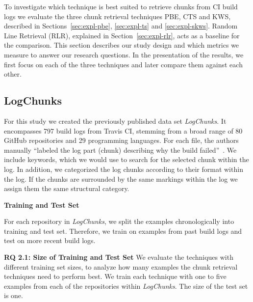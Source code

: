 To investigate which technique is best suited to retrieve chunks from
CI build logs we evaluate the three chunk retrieval techniques
PBE, CTS and KWS, described in Sections~\ref{sec:expl-pbe},
\ref{sec:expl-ts} and \ref{sec:expl-skws}.
Random Line Retrieval
(RLR), explained in Section~\ref{sec:expl-rlr}, acts as a baseline for
the comparison.
This section
describes our study design and which metrics we measure to answer our
research questions.
In the presentation of the results, we first focus
on each of the three techniques and later compare them against each
other.

\subsection{LogChunks}
For this study we created the previously published data set
\emph{LogChunks}.
It encompasses 797 build logs from Travis CI,
stemming from a broad range of 80 GitHub repositories and 29
programming languages.
For each file, the authors manually ``labeled
the log part (chunk) describing why the build
failed''~\cite{brandt2020logchunks}.
We include keywords, which we
would use to search for the selected chunk within the log.
In
addition, we categorized the log chunks according to their format
within the log.
If the chunks are surrounded by the same markings
within the log we assign them the same structural category.


\noindent
\textbf{Training and Test Set}

For each repository in \emph{LogChunks}, we split the examples
chronologically into training and test set.
Therefore, we train on
examples from past build logs and test on more recent build logs.

\noindent %
\textbf{RQ 2.1: Size of Training and Test Set}
We evaluate the techniques with different training set
sizes, to analyze how many examples the chunk retrieval techniques need to
perform best.
We train each technique with one to five examples from each of
the repositories within \emph{LogChunks}.
The size of the test set is one.

